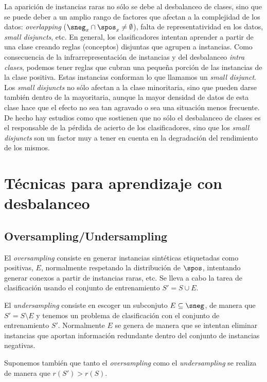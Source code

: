 La aparición de instancias raras no sólo se debe al desbalanceo de clases, sino que se puede deber a un amplio rango de factores 
que afectan a la complejidad de los datos: \textit{overlapping} ($\sneg_x \cap \spos_x \neq \emptyset$), falta de 
representatividad en los datos, \textit{small disjuncts}, etc. En general, los clasificadores intentan aprender a partir de una clase 
creando reglas (conceptos) disjuntas que agrupen a instancias. Como consecuencia de la infrarrepresentación de instancias y del 
desbalanceo \textit{intra clases}, podemos tener reglas que cubran una pequeña porción de las instancias de la clase 
positiva. Estas instancias conforman lo que llamamos un \textit{small disjunct}. Los \textit{small disjuncts} no sólo afectan 
a la clase minoritaria, sino que pueden darse también dentro de la mayoritaria, aunque la mayor densidad de datos de esta clase 
hace que el efecto no sea tan agravado o sea una situación menos frecuente. De hecho hay estudios como \citep{jo2004} que sostienen 
que no sólo el desbalanceo de clases es el responsable de la pérdida de acierto de los clasificadores, sino que los \textit{small disjuncts}
son un factor muy a tener en cuenta en la degradación del rendimiento de los mismos.


\section{Técnicas para aprendizaje con desbalanceo}
\subsection{Oversampling/Undersampling}
El \textit{oversampling} consiste en generar instancias sintéticas etiquetadas como positivas, $E$, normalmente 
respetando la distribución de $\spos$, intentando generar conexos a partir de instancias raras, etc. Se lleva a cabo la 
tarea de clasificación usando el conjunto de entrenamiento $S' = S\cup E$. 

El \textit{undersampling} consiste en escoger un subconjuto $E \subseteq \sneg$, de manera que $S' = S\setminus E$ 
y tenemos un problema de clasificación con el conjunto de entrenamiento $S'$. Normalmente $E$ se genera de manera que se
intentan eliminar instancias que aportan información redundante dentro del conjunto de instancias negativas.

Suponemos también que tanto el \textit{oversampling} como el \textit{undersampling} se realiza de manera que $r(S') > r(S)$.

